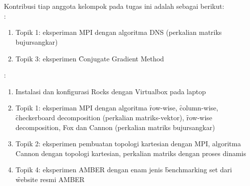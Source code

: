 \chapter{\kontribusi}
Kontribusi tiap anggota kelompok pada tugas ini adalah sebagai berikut: \\[8pt]

:
\begin{enumerate}
	\item Topik 1: eksperiman MPI dengan algoritma DNS (perkalian matriks bujursangkar)
	\item Topik 3: eksperimen \f{Conjugate Gradient Method}
\end{enumerate}

:
\begin{enumerate}
	\item Instalasi dan konfigurasi \cluster Rocks dengan Virtualbox pada laptop
	\item Topik 1: eksperiman MPI dengan algoritma \f{row-wise}, \f{column-wise}, \f{checkerboard decomposition} (perkalian matriks-vektor), \f{row-wise decomposition}, Fox dan Cannon (perkalian matriks bujursangkar)
	\item Topik 2: eksperimen pembuatan topologi kartesian dengan MPI, algoritma Cannon dengan topologi kartesian, perkalian matriks dengan proses dinamis
	\item Topik 4: eksperimen AMBER dengan enam jenis \f{benchmarking set} dari \f{website} resmi AMBER
\end{enumerate}

